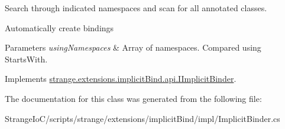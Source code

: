 Search through indicated namespaces and scan for all annotated classes. 

Automatically create bindings 


\begin{DoxyParams}{Parameters}
{\em using\-Namespaces} & Array of namespaces. Compared using Starts\-With. \\
\hline
\end{DoxyParams}


Implements \hyperlink{interfacestrange_1_1extensions_1_1implicit_bind_1_1api_1_1_i_implicit_binder_a6329cede9039c5848601f022bd974ad9}{strange.\-extensions.\-implicit\-Bind.\-api.\-I\-Implicit\-Binder}.



The documentation for this class was generated from the following file\-:\begin{DoxyCompactItemize}
\item 
Strange\-Io\-C/scripts/strange/extensions/implicit\-Bind/impl/Implicit\-Binder.\-cs\end{DoxyCompactItemize}
